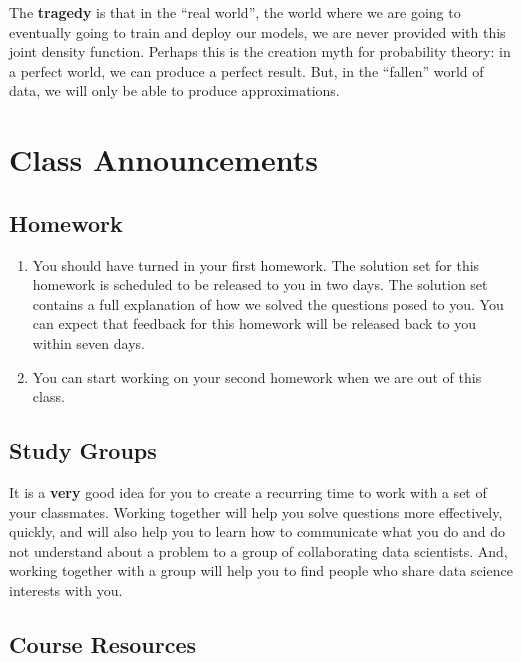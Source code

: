 \documentclass[
]{book}
\providecommand{\tightlist}{%
  \setlength{\itemsep}{0pt}\setlength{\parskip}{0pt}}
\theoremstyle{definition}
\theoremstyle{definition}
\theoremstyle{definition}
\theoremstyle{definition}
\theoremstyle{remark}
\begin{document}
The \textbf{tragedy} is that in the ``real world'', the world where we are going to eventually going to train and deploy our models, we are never provided with this joint density function. Perhaps this is the creation myth for probability theory: in a perfect world, we can produce a perfect result. But, in the ``fallen'' world of data, we will only be able to produce approximations.

\hypertarget{class-announcements}{%
\section{Class Announcements}\label{class-announcements}}

\hypertarget{homework}{%
\subsection*{Homework}\label{homework}}

\begin{enumerate}
\def\labelenumi{\arabic{enumi}.}
\tightlist
\item
  You should have turned in your first homework. The solution set for this homework is scheduled to be released to you in two days. The solution set contains a full explanation of how we solved the questions posed to you. You can expect that feedback for this homework will be released back to you within seven days.
\item
  You can start working on your second homework when we are out of this class.
\end{enumerate}

\hypertarget{study-groups}{%
\subsection*{Study Groups}\label{study-groups}}

It is a \textbf{very} good idea for you to create a recurring time to work with a set of your classmates. Working together will help you solve questions more effectively, quickly, and will also help you to learn how to communicate what you do and do not understand about a problem to a group of collaborating data scientists. And, working together with a group will help you to find people who share data science interests with you.

\hypertarget{course-resources}{%
\subsection*{Course Resources}\label{course-resources}}
\end{document}
